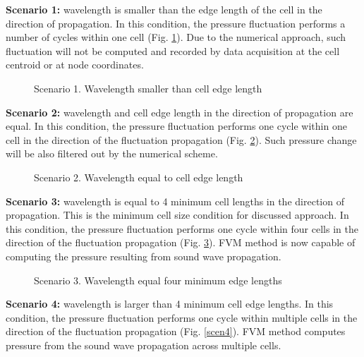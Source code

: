 \textbf{Scenario 1:} wavelength is smaller than the edge length of the cell in the direction of propagation. In this condition, the pressure fluctuation performs a number of cycles within one cell (Fig. \ref{scen1}). Due to the numerical approach, such fluctuation will not be computed and recorded by data acquisition at the cell centroid or at node coordinates.

\begin{figure}[h!]
\centering %
\caption{Scenario 1. Wavelength smaller than cell edge length}
\label{scen1}
\end{figure}

\textbf{Scenario 2:} wavelength and cell edge length in the direction of propagation are equal. In this condition, the pressure fluctuation performs one cycle within one cell in the direction of the fluctuation propagation (Fig. \ref{scen2}). Such pressure change will be also filtered out by the numerical scheme.

\begin{figure}[h!]
\centering %
\caption{Scenario 2. Wavelength equal to cell edge length}
\label{scen2}
\end{figure}

\textbf{Scenario 3:} wavelength is equal to 4 minimum cell lengths in the direction of propagation. This is the minimum cell size condition for discussed approach. In this condition, the pressure fluctuation performs one cycle within four cells in the direction of the fluctuation propagation (Fig. \ref{scen3}). FVM method is now capable of computing the pressure resulting from sound wave propagation.

\begin{figure}[h!]
\centering %
\caption{Scenario 3. Wavelength equal four minimum edge lengths}
\label{scen3}
\end{figure}

\textbf{Scenario 4:} wavelength is larger than 4 minimum cell edge lengths. In this condition, the pressure fluctuation performs one cycle within multiple cells in the direction of the fluctuation propagation (Fig. \ref{scen4}). FVM method computes pressure from the sound wave propagation across multiple cells.

